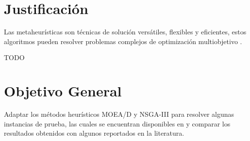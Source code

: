 \documentclass[letterpaper,10pt]{article}
\begin{document}
\section{Justificación}

%
Las metaheurísticas son técnicas de solución versátiles, flexibles y eficientes, estos algoritmos pueden resolver problemas complejos de optimización multiobjetivo \cite{coello1999comprehensive} .
\newline

{\huge TODO}

%
%      

\section{Objetivo General}

Adaptar los métodos heurísticos MOEA/D y NSGA-III para resolver algunas instancias de prueba, las cuales se encuentran disponibles en \cite{zhang2008multiobjective} y comparar los resultados obtenidos con algunos reportados en la literatura.
\end{document}

